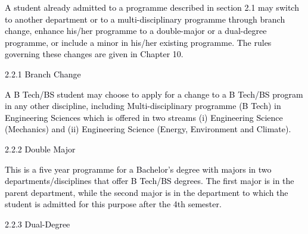 \documentclass[12pt]{article}
\begin{document}
\vspace{\baselineskip}
\begin{justify}
{\fontsize{9pt}{10.8pt}\selectfont \textcolor[HTML]{00000A}{A student already admitted to a programme described in section 2.1 may switch to another department or to a multi-disciplinary programme through branch change, enhance his/her programme to a double-major or a dual-degree programme, or include a minor in his/her existing programme. The rules governing these changes are given in Chapter 10.}\par}
\end{justify}\par


\vspace{\baselineskip}
{\fontsize{10pt}{12.0pt}\selectfont \textcolor[HTML]{00000A}{2.2.1 Branch Change}\par}\par


\vspace{\baselineskip}
\begin{justify}
{\fontsize{10pt}{12.0pt}\selectfont \textcolor[HTML]{00000A}{A B Tech/BS student may choose to apply for a change to a B Tech/BS program in any other discipline, including Multi-disciplinary programme (B Tech) in Engineering Sciences which is offered in two streams (i) Engineering Science (Mechanics) and (ii) Engineering Science (Energy, Environment and Climate).}\par}
\end{justify}\par


\vspace{\baselineskip}
{\fontsize{10pt}{12.0pt}\selectfont \textcolor[HTML]{00000A}{2.2.2 Double Major}\par}\par


\vspace{\baselineskip}
\begin{justify}
{\fontsize{10pt}{12.0pt}\selectfont \textcolor[HTML]{00000A}{This is a five year programme for a Bachelor’s degree with majors in two departments/disciplines that offer B Tech/BS degrees. The first major is in the parent department, while the second major is in the department to which the student is admitted for this purpose after the 4th semester.}\par}
\end{justify}\par


\vspace{\baselineskip}
{\fontsize{10pt}{12.0pt}\selectfont \textcolor[HTML]{00000A}{2.2.3 Dual-Degree}\par}\par
\end{document}
